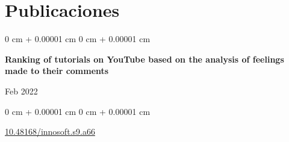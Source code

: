 \documentclass[10pt, letterpaper]{article}
\newenvironment{highlights}{
    \begin{itemize}[
        topsep=0.10 cm,
        parsep=0.10 cm,
        partopsep=0pt,
        itemsep=0pt,
        leftmargin=0 cm + 10pt
    ]
}{
    \end{itemize}
} %
\newenvironment{onecolentry}{
    \begin{adjustwidth}{
        0 cm + 0.00001 cm
    }{
        0 cm + 0.00001 cm
    }
}{
    \end{adjustwidth}
} %
\newenvironment{twocolentry}[2][]{
    \onecolentry
    \def\secondColumn{#2}
    \setcolumnwidth{\fill, 4.5 cm}
    \begin{paracol}{2}
}{
    \switchcolumn \raggedleft \secondColumn
    \end{paracol}
    \endonecolentry
} %
\begin{document}

       
    \section{Publicaciones}



        
        \begin{samepage}
            \begin{twocolentry}{
                Feb 2022
            }
                \textbf{Ranking of tutorials on YouTube based on the analysis of feelings made to their comments}
            \end{twocolentry}

            \vspace{0.10 cm}
            
            \begin{onecolentry}
                

                \vspace{0.10 cm}
                
        \href{https://doi.org/10.48168/innosoft.s9.a66}{10.48168/innosoft.s9.a66}
        \end{onecolentry}
        \end{samepage}


    
        

\end{document}
